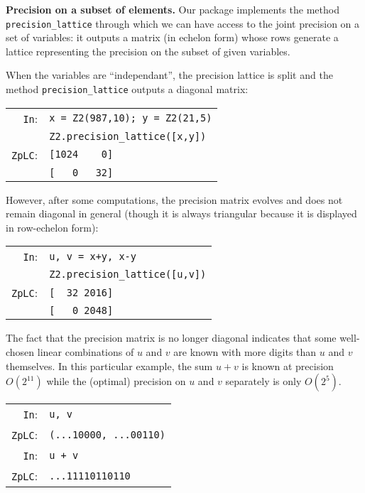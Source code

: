 \documentclass[sigconf]{acmart}
\newcommand{\cIn}{{\color{input} \tt \phantom{Zp}In}:}
\newcommand{\cZpLC}{{\color{output} \tt ZpLC}:}
\theoremstyle{definition}
\begin{document}
\noindent \textbf{Precision on a subset of elements.}
%
Our package implements the method {\color{method}\verb?precision_lattice?} through which 
we can have access to the joint precision on a set of variables: it 
outputs a matrix (in echelon form) whose rows generate a lattice 
representing the precision on the subset of given variables.

When the variables are ``independant'', the precision lattice is
split and the method {\color{method}\verb?precision_lattice?} outputs a diagonal
matrix:

\smallskip

{\noindent \small
\begin{tabular}{rl}
\cIn   & \verb?x = ?{\color{ring}\verb?Z2?}\verb?(987,10); y = ?{\color{ring}\verb?Z2?}\verb?(21,5)? \\
       & {\color{ring}\verb?Z2?}\verb?.?{\color{method}\verb?precision_lattice?}\verb?([x,y])? \\
\cZpLC & \verb?[1024    0]? \\
       & \verb?[   0   32]?
\end{tabular}}

\smallskip

\noindent
However, after some computations, the precision matrix evolves and 
does not remain diagonal in general (though it is always triangular
because it is displayed in row-echelon form):

\smallskip

{\noindent \small
\begin{tabular}{rl}
\cIn   & \verb?u, v = x+y, x-y? \\
       & {\color{ring}\verb?Z2?}\verb?.?{\color{method}\verb?precision_lattice?}\verb?([u,v])? \\
\cZpLC & \verb?[  32 2016]? \\
       & \verb?[   0 2048]?
\end{tabular}}

\smallskip

\noindent
The fact that the precision matrix is no longer diagonal indicates
that some well-chosen linear combinations of $u$ and $v$ are known
with more digits than $u$ and $v$ themselves. In this particular
example, the sum $u+v$ is known at precision $O(2^{11})$ while the
(optimal) precision on $u$ and $v$ separately is only $O(2^5)$.

\smallskip

{\noindent \small
\begin{tabular}{rl}
\cIn   & \verb?u, v? \\
\cZpLC & \verb?(...10000, ...00110)? \\
\cIn   & \verb?u + v? \\
\cZpLC & \verb?...11110110110? \\
\end{tabular}}
\end{document}
